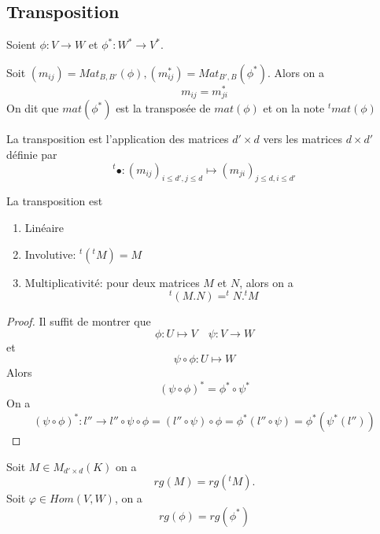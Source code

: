 \documentclass[../main.tex]{subfiles}
\begin{document}
\subsection{Transposition}
Soient $\phi: V \to W$ et $\phi^{*}: W^{*}\to V^{*}$.
\begin{thm}
	Soit $( m_{ij} ) = Mat_{B,B'} ( \phi) , ( m_{ij} ^{*}) = Mat_{B',B} ( \phi^{*}) $. Alors on a
	\[ 
	m_{ij} = m_{ji}^{*}
	\]
	On dit que $mat( \phi^{*}) $ est la transposée de $mat( \phi) $ et on la note $^{t}mat( \phi) $
\end{thm}
\begin{defn}
	La transposition est l'application des matrices $d'\times d$ vers les matrices $d\times d'$ définie par
	\[ 
		^{t}\bullet: ( m_{ij})_{i\leq d', j \leq d}  \mapsto ( m_{ji} ) _{j\leq d, i \leq d'} 
	\]
	
\end{defn}
\begin{propo}
La transposition est 
\begin{enumerate}
\item Linéaire
\item Involutive: $^{t}( ^{t}M) = M$ 
\item Multiplicativité: pour  deux matrices $M$ et $N$, alors on a
	\[ 
		^{t}(M.N ) = ^{t}N.^{t}M
	\]
	
\end{enumerate}

\end{propo}
\begin{proof}
	Il suffit de montrer que
	\[ 
	\phi: U \mapsto V \quad \psi: V \to W
	\]
	et 
	\[ 
	\psi\circ\phi: U \mapsto W
	\]
	Alors 
	\[ 
		( \psi\circ\phi) ^{*} = \phi^{*}\circ \psi^{*}
	\]
On a
\[ 
	( \psi\circ\phi) ^{*}: l'' \to l'' \circ \psi\circ\phi = ( l''\circ\psi) \circ\phi = \phi^{*}( l''\circ\psi) = \phi^{*}( \psi^{*}( l'') ) 
\]

\end{proof}
\begin{propo}
	Soit $M \in M_{d'\times d} ( K) $ on a
	\[ 
		rg( M) = rg( ^{t}M) .
	\]
	Soit $\varphi \in Hom( V,W)$, on a
	\[ 
		rg( \phi) = rg( \phi^{*}) 	
	\]
	
\end{propo}
\end{document}
